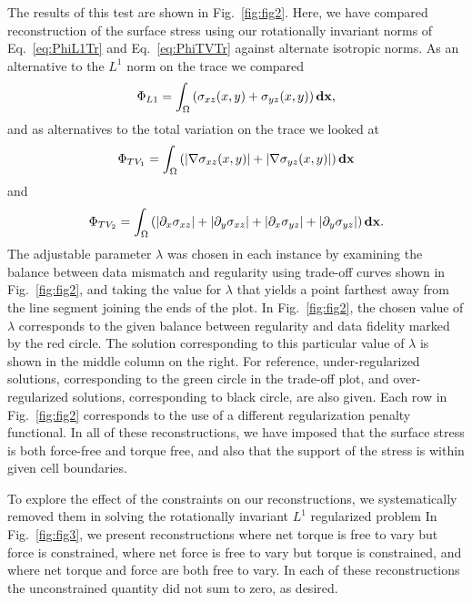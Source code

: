 \documentclass[aps,prl,reprint,twocolumn,groupedaddress,showpacs]{revtex4-1}
\def\d{{\bf d}}
\def\x{{\bf x}}
\begin{document}
The results of this test are shown in Fig.~\ref{fig:fig2}. Here, we have compared reconstruction of the surface stress using our rotationally invariant norms of Eq.~\ref{eq:PhiL1Tr} and Eq.~\ref{eq:PhiTVTr} against alternate isotropic norms. As an alternative to the $L^1$ norm on the trace we compared
\begin{equation}
\Phi_{L1} = \int_\Omega \left( \sigma_{xz}(x,y) +\sigma_{yz}(x,y) \right)\d\x,
\end{equation} 
and as alternatives to the total variation on the trace we looked at
 \begin{equation}
 \Phi_{TV_1} = \int_\Omega \left( \vert\nabla\sigma_{xz}(x,y) \vert + \vert\nabla\sigma_{yz}(x,y) \vert\right)\d\x
 \label{eq:PhiTV1}
\end{equation}
and
\begin{equation}
\Phi_{TV_2} = \int_\Omega  \left( \vert\partial_x\sigma_{xz}\vert + \vert\partial_y\sigma_{xz}\vert + \vert\partial_x\sigma_{yz}\vert+ \vert\partial_y\sigma_{yz}\vert\right)\d\x.
 \label{eq:PhiTV2}
\end{equation}
 The adjustable parameter $\lambda$ was chosen in each instance by examining the balance between data mismatch and regularity using trade-off curves shown in Fig.~\ref{fig:fig2}, and taking the value for $\lambda$ that yields a point farthest away from the line  segment joining the ends of the plot. In Fig.~\ref{fig:fig2}, the chosen value of $\lambda$ corresponds to the given balance between regularity and data fidelity marked by the red circle. The solution corresponding to this particular value of $\lambda$ is shown in the middle column on the right. For reference, under-regularized solutions, corresponding to the green  circle in the trade-off plot, and over-regularized solutions, corresponding to black circle, are also given. Each row in Fig.~\ref{fig:fig2} corresponds to the use of a different regularization penalty functional. In all of these reconstructions, we have imposed that the surface stress is both force-free and torque free, and also that the support of the stress is within given cell boundaries.

To explore the effect of the constraints on our reconstructions, we systematically removed them in solving the rotationally invariant $L^1$ regularized problem In Fig.~\ref{fig:fig3}, we present reconstructions where net torque is free to vary but force is constrained, where net force is free to vary but torque is constrained, and where net torque and force are both free to vary. In each of these reconstructions the unconstrained quantity did not sum to zero, as desired.
\end{document}
